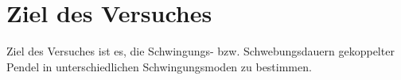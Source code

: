 \section{Ziel des Versuches}
\label{sec:Ziel des Versuches}
Ziel des Versuches ist es, die Schwingungs- bzw. Schwebungsdauern gekoppelter Pendel in unterschiedlichen Schwingungsmoden zu bestimmen.
